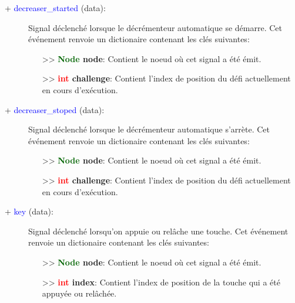 \documentclass[a4paper, 11pt]{article}
\begin{document}
	\begin{description}
		\item [+ \textcolor{blue}{decreaser\_started} (data):] Signal déclenché lorsque le décrémenteur 
		automatique se démarre. Cet événement renvoie un dictionaire contenant les clés suivantes:
		\begin{itemize}
			\item [>> \textbf{\textcolor{darkgreen}{Node} node}:] Contient le noeud où cet signal a été 
			émit.
			\item [>> \textbf{\textcolor{red}{int} challenge}:] Contient l'index de position du défi 
			actuellement en cours d'exécution.\\
		\end{itemize}
	\end{description}
	\begin{description}
		\item [+ \textcolor{blue}{decreaser\_stoped} (data):] Signal déclenché lorsque le décrémenteur 
		automatique s'arrète. Cet événement renvoie un dictionaire contenant les clés suivantes:
		\begin{itemize}
			\item [>> \textbf{\textcolor{darkgreen}{Node} node}:] Contient le noeud où cet signal a été 
			émit.
			\item [>> \textbf{\textcolor{red}{int} challenge}:] Contient l'index de position du défi 
			actuellement en cours d'exécution.\\
		\end{itemize}
	\end{description}
	\newpage \begin{description}
		\item [+ \textcolor{blue}{key} (data):] Signal déclenché lorsqu'on appuie ou relâche une touche. Cet 
		événement renvoie un dictionaire contenant les clés suivantes:
		\begin{itemize}
			\item [>> \textbf{\textcolor{darkgreen}{Node} node}:] Contient le noeud où cet signal a été 
			émit.
			\item [>> \textbf{\textcolor{red}{int} index}:] Contient l'index de position de la touche qui a 
			été appuyée ou relâchée.\\
		\end{itemize}
	\end{description}
\end{document}
